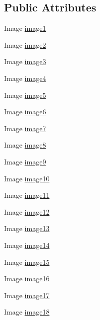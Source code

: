 \subsection*{Public Attributes}
\begin{DoxyCompactItemize}
\item 
Image \mbox{\hyperlink{class_win_con_hard_ac8813458f4edad866699cc841fa0bc16}{image1}}
\item 
Image \mbox{\hyperlink{class_win_con_hard_a035513335d3a18e58ae22fc0c935f2f7}{image2}}
\item 
Image \mbox{\hyperlink{class_win_con_hard_aac8d99111f9005e76859f9254999804a}{image3}}
\item 
Image \mbox{\hyperlink{class_win_con_hard_a14a2ff3b5b2492f5074359ab380c9fdf}{image4}}
\item 
Image \mbox{\hyperlink{class_win_con_hard_ac07d21b9397afeaf8e33a2f708465229}{image5}}
\item 
Image \mbox{\hyperlink{class_win_con_hard_a48aeec1cb9bc2a00609d5be92c169d75}{image6}}
\item 
Image \mbox{\hyperlink{class_win_con_hard_ac97b920408fdbea74474c70f1b2ab775}{image7}}
\item 
Image \mbox{\hyperlink{class_win_con_hard_af90e4816d004bcbaaca8f1fd884f0e18}{image8}}
\item 
Image \mbox{\hyperlink{class_win_con_hard_ad8bd277cfe6419b99eea50ea2b991eec}{image9}}
\item 
Image \mbox{\hyperlink{class_win_con_hard_ad9ef6fd00820d93acec38f569b13bb6e}{image10}}
\item 
Image \mbox{\hyperlink{class_win_con_hard_a5914f771136789051a77129b79767d65}{image11}}
\item 
Image \mbox{\hyperlink{class_win_con_hard_a976a2b5ef28197ac464f8ee23b2816d2}{image12}}
\item 
Image \mbox{\hyperlink{class_win_con_hard_ac9ef6f35df283cfaa0da27cad55204d2}{image13}}
\item 
Image \mbox{\hyperlink{class_win_con_hard_a21707563ff3670e03f1c99c74098d177}{image14}}
\item 
Image \mbox{\hyperlink{class_win_con_hard_a6eb1b79cd00189b1cf52d064370917aa}{image15}}
\item 
Image \mbox{\hyperlink{class_win_con_hard_a08f1f6b90b25f2346f64249069cc46cf}{image16}}
\item 
Image \mbox{\hyperlink{class_win_con_hard_aa7029fd9d2463eea8f2a4edd5244a31f}{image17}}
\item 
Image \mbox{\hyperlink{class_win_con_hard_a17ce105251685494ab063f0dacc543af}{image18}}

\end{DoxyCompactItemize}
